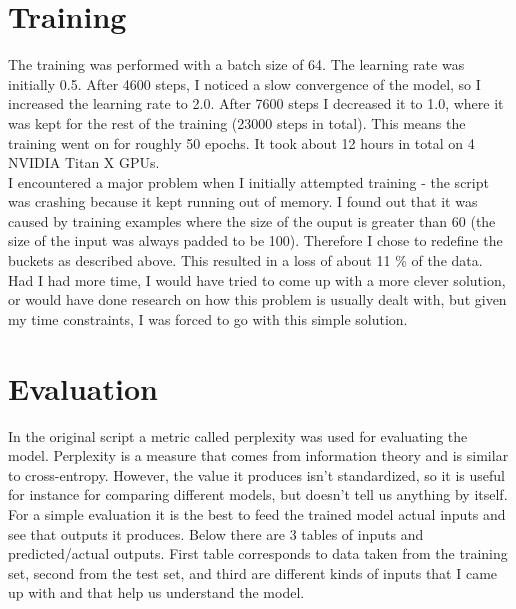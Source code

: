\documentclass[12pt]{article}
\begin{document}
\section{Training}

The training was performed with a batch size of 64. The learning rate was initially 0.5. After 4600 steps, I noticed a slow convergence of the model, so I increased the learning rate to 2.0. After 7600 steps I decreased it to 1.0, where it was kept for the rest of the training (23000 steps in total). This means the training went on for roughly 50 epochs. It took about 12 hours in total on 4 NVIDIA Titan X GPUs. \\

I encountered a major problem when I initially attempted training - the script was crashing because it kept running out of memory. I found out that it was caused by training examples where the size of the ouput is greater than 60 (the size of the input was always padded to be 100). Therefore I chose to redefine the buckets as described above. This resulted in a loss of about 11 \% of the data. Had I had more time, I would have tried to come up with a more clever solution, or would have done research on how this problem is usually dealt with, but given my time constraints, I was forced to go with this simple solution. \\

\section{Evaluation}

In the original script a metric called perplexity was used for evaluating the model. Perplexity is a measure that comes from information theory and is similar to cross-entropy. However, the value it produces isn't standardized, so it is useful for instance for comparing different models, but doesn't tell us anything by itself. \\

For a simple evaluation it is the best to feed the trained model actual inputs and see that outputs it produces. Below there are 3 tables of inputs and predicted/actual outputs. First table corresponds to data taken from the training set, second from the test set, and third are different kinds of inputs that I came up with and that help us understand the model. \\
\end{document}
